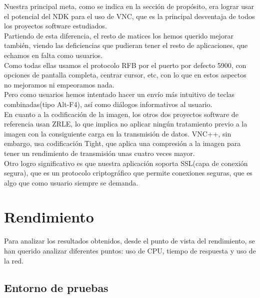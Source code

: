 Nuestra principal meta, como se indica en la sección de propósito, era lograr usar el potencial del NDK para el uso de VNC, que es la principal desventaja de todos los proyectos software estudiados.\\

Partiendo de esta diferencia, el resto de matices los hemos querido mejorar también, viendo las deficiencias que pudieran tener el resto de aplicaciones, que echamos en falta como usuarios.\\

Como todas ellas usamos el protocolo RFB por el puerto por defecto 5900, con opciones de pantalla completa, centrar cursor, etc, con lo que en estos aspectos no mejoramos ni empeoramos nada.\\

Pero como usuarios hemos intentado hacer un envío más intuitivo de teclas combinadas(tipo Alt-F4), así como diálogos informativos al usuario.\\

En cuanto a la codificación de la imagen, los otros dos proyectos software de referencia usan ZRLE, lo que implica no aplicar ningún tratamiento previo a la imagen con la consiguiente carga en la transmisión de datos. VNC++, sin embargo, usa codificación Tight, que aplica una compresión a la imagen para tener un rendimiento de transmisión unas cuatro veces mayor.\\

Otro logro significativo es que nuestra aplicación soporta SSL(capa de conexión segura), que es un protocolo criptográfico que permite conexiones seguras, que es algo que como usuario siempre se demanda.\\

\section{Rendimiento}

Para analizar los resultados obtenidos, desde el punto de vista del rendimiento, se han querido analizar diferentes puntos: uso de CPU, tiempo de respuesta y uso de la red.

\subsection{Entorno de pruebas}

